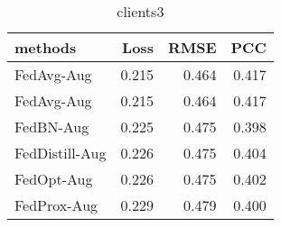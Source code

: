 \begin{table}
\caption{clients3}
\begin{tabular}{lrrr}
\toprule
methods & Loss & RMSE & PCC \\
\midrule
FedAvg-Aug & 0.215 & 0.464 & 0.417 \\
FedAvg-Aug & 0.215 & 0.464 & 0.417 \\
FedBN-Aug & 0.225 & 0.475 & 0.398 \\
FedDistill-Aug & 0.226 & 0.475 & 0.404 \\
FedOpt-Aug & 0.226 & 0.475 & 0.402 \\
FedProx-Aug & 0.229 & 0.479 & 0.400 \\
\bottomrule
\end{tabular}
\end{table}
